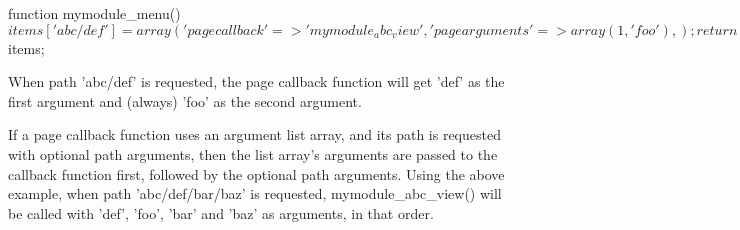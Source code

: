 \begin{DoxyCode}
   function mymodule_menu() {
     $items['abc/def'] = array(
       'page callback' => 'mymodule_abc_view',
       'page arguments' => array(1, 'foo'),
     );
     return $items;
   }
\end{DoxyCode}
 When path 'abc/def' is requested, the page callback function will get 'def' as the first argument and (always) 'foo' as the second argument.

If a page callback function uses an argument list array, and its path is requested with optional path arguments, then the list array's arguments are passed to the callback function first, followed by the optional path arguments. Using the above example, when path 'abc/def/bar/baz' is requested, mymodule\_\-abc\_\-view() will be called with 'def', 'foo', 'bar' and 'baz' as arguments, in that order.

